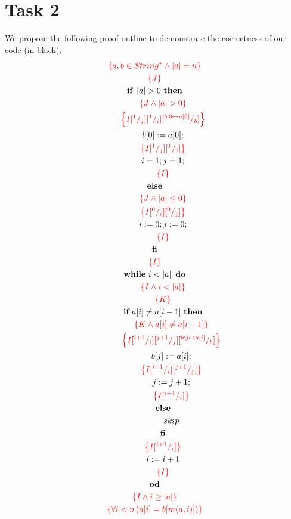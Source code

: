 \documentclass[a4paper,12pt,fleqn]{scrartcl}
\newcommand{\assn}[1]{{\color{red}\left\{#1\right\}}}
\newcommand{\length}[1]{\left|#1\right|}
\begin{document}
\section{Task 2}
We propose the following proof outline to demonstrate the correctness
of our code (in black).
\begin{gather}
    \assn{a,b\in String^*\And\length{a} = n}\\
    \assn{J}\\
    \IF~ \length{a} >0 ~ \THEN\\
    \qquad \assn{J \And \length{a} > 0}\\
    \qquad \assn{I \subst{1}{j} \subst{1}{i} \subst{b:0 \mapsto a[0]}{b}}\\
    \qquad b[0] \Ass a[0];\\
    \qquad \assn{I \subst{1}{j} \subst{1}{i}  }\\
    \qquad i=1;j=1;\\
    \qquad \assn{I}\\
    \ELSE\\ 
    \qquad \assn{J \And \length{a} \leq 0}\\
    \qquad \assn{I\subst{0}{i}\subst{0}{j}}\\
    \qquad i\Ass 0;j\Ass 0;\\
    \qquad \assn{I}\\
    \FI\\
% 
    \assn{I}\\
    \WHILE~i<\length{a}~\DO\\
    \qquad \assn{I \And i < \length{a}}\\
    \qquad \assn{K }\\
    \qquad \IF~a[i] \neq a[i-1]~ \THEN\\
    \qquad \qquad \assn{K \And a[i]\neq a[i-1]}\\
    \qquad \qquad \assn{I \subst{i+1}{i} \subst{j+1}{j} \subst{b:j\mapsto a[i]}{b}}\\
    \qquad \qquad b[j] \Ass a[i];\\
    \qquad \qquad \assn{I \subst{i+1}{i} \subst{j+1}{j} }\\
    \qquad \qquad j \Ass j +1;\\
    \qquad \qquad \assn{I \subst{i+1}{i}}\\
    \qquad \ELSE\\
    \qquad \qquad skip \\
    \qquad \FI\\
    \qquad \assn{I \subst{i+1}{i}}\\
    \qquad i \Ass i +1 \\
    \qquad \assn{I}\\
    \OD\\
% 
    \assn{I \And i \geq \length{a}}\\
    \assn{\All {i < n}{a[i] = b[m(a,i)]}}
\end{gather}
\end{document}
